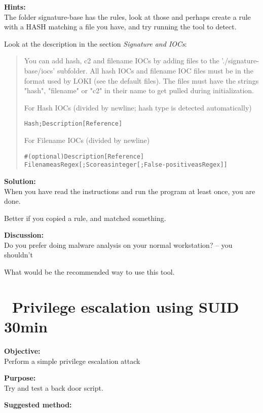 \documentclass[a4paper,11pt,notitlepage]{report}
\begin{document}
{\bf Hints:}\\
The folder signature-base has the rules, look at those and perhaps create a rule with a HASH matching a file you have, and try running the tool to detect.

Look at the description in the section \emph{Signature and IOCs}:

\begin{quote}
You can add hash, c2 and filename IOCs by adding files to the './signature-base/iocs' subfolder. All hash IOCs and filename IOC files must be in the format used by LOKI (see the default files). The files must have the strings "hash", "filename" or "c2" in their name to get pulled during initialization.

For Hash IOCs (divided by newline; hash type is detected automatically)

\begin{alltt}
Hash;Description [Reference]
\end{alltt}

For Filename IOCs (divided by newline)
\begin{alltt}
# (optional) Description [Reference]
Filename as Regex[;Score as integer[;False-positive as Regex]]
\end{alltt}
\end{quote}

{\bf Solution:}\\
When you have read the instructions and run the program at least once, you are done.

Better if you copied a rule, and matched something.

{\bf Discussion:}\\
Do you prefer doing malware analysis on your normal workstation? -- you shouldn't

What would be the recommended way to use this tool.



\chapter{\faExclamationTriangle\ Privilege escalation using SUID 30min}
\label{ex:priv-esc-cron}

{\bf Objective:}\\
Perform a simple privilege escalation attack

{\bf Purpose:}\\
Try and test a back door script.

{\bf Suggested method:}\\
\end{document}
